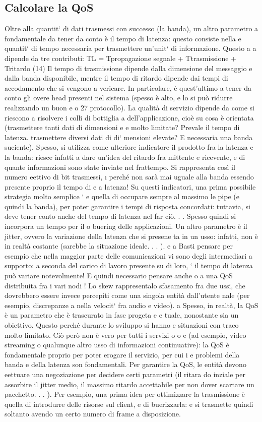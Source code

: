 \documentclass[a4paper,12pt]{article}
\begin{document}
\subsection{Calcolare la QoS}
Oltre alla quantit` di dati trasmessi con successo (la banda), un altro parametro
a
fondamentale da tener da conto è il tempo di latenza: questo consiste nella
e
quantit` di tempo necessaria per trasmettere un'unit` di informazione. Questo
a
a
dipende da tre contributi:
TL = Tpropagazione segnale + Ttrasmissione + Tritardo
(14)
Il tempo di trasmissione dipende dalla dimensione del messaggio e dalla banda
disponibile, mentre il tempo di ritardo dipende dai tempi di accodamento che
si vengono a vericare. In particolare, è quest'ultimo a tener da conto gli overe
head presenti nel sistema (spesso è alto, e lo si può ridurre realizzando un buon
e
o
27
protocollo).
La qualità di servizio dipende da come si riescono a risolvere i colli di bottiglia
a
dell'applicazione, cioè su cosa è orientata (trasmettere tanti dati di dimensioni
e
e
molto limitate? Prevale il tempo di latenza. trasmettere diversi dati di di`
mensioni elevate? E necessaria una banda suciente). Spesso, si utilizza come
ulteriore indicatore il prodotto fra la latenza e la banda: riesce infatti a dare
un'idea del ritardo fra mittente e ricevente, e di quante informazioni sono state
inviate nel frattempo. Si rappresenta così il numero eettivo di bit trasmessi,
\i{}
perché non sarà mai uguale alla banda essendo presente proprio il tempo di
e
a
latenza! Su questi indicatori, una prima possibile strategia molto semplice `
e
quella di occupare sempre al massimo le pipe (e quindi la banda), per poter
garantire i tempi di risposta concordati: tuttavia, si deve tener conto anche
del tempo di latenza nel far ciò. . . Spesso quindi si incorpora un tempo per il
o
buering delle applicazioni.
Un altro parametro è il jitter, ovvero la variazione della latenza che si presene
ta in un usso: infatti, non è in realtà costante (sarebbe la situazione ideale. . . ).
e
a
Basti pensare per esempio che nella maggior parte delle comunicazioni vi sono
degli intermediari a supporto: a seconda del carico di lavoro presente su di loro,
`
il tempo di latenza può variare notevolmente! E quindi necessario pensare anche
o
a una QoS distribuita fra i vari nodi !
Lo skew rappresentalo sfasamento fra due ussi, che dovrebbero essere invece
percepiti come una singola entità dall'utente nale (per esempio, discrepanze
a
nella velocit` fra audio e video).
a
Spesso, in realtà, la QoS è un parametro che è trascurato in fase progeta
e
e
tuale, nonostante sia un obiettivo. Questo perché durante lo sviluppo si hanno
e
situazioni con traco molto limitato. Ciò però non è vero per tutti i servizi
o
o
e
(ad esempio, video streaming o qualunque altro usso di informazioni continuative): la QoS è fondamentale proprio per
poter erogare il servizio, per cui i
e
problemi della banda e della latenza son fondamentali. Per garantire la QoS, le
entità devono eettuare una negoziazione per decidere certi parametri (il ritara
do inziale per assorbire il jitter medio, il massimo ritardo accettabile per non
dover scartare un pacchetto. . . ). Per esempio, una prima idea per ottimizzare
la trasmissione è quella di introdurre delle risorse sul client, e di buerizzarla:
e
si trasmette quindi soltanto avendo un certo numero di frame a disposizione.
\end{document}
